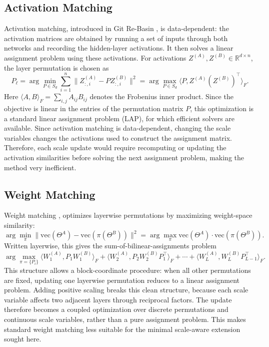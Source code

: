 \documentclass[11pt,a4paper]{report}
\begin{document}
\subsection{Activation Matching}
Activation matching, introduced in Git Re-Basin \citet{ainsworth2023git}, is data-dependent: the activation matrices are obtained by running a set of inputs through both networks and recording the hidden-layer activations. It then solves a linear assignment problem using these activations. For activations \(Z^{(A)}, Z^{(B)} \in \mathbb{R}^{d \times n}\), the layer permutation is chosen as
\[
P_\ell
=
\arg\min_{P \in S_d}
\sum_{i=1}^n \|Z^{(A)}_{:,i} - P Z^{(B)}_{:,i}\|^2
=
\arg\max_{P \in S_d}
\langle P, Z^{(A)}(Z^{(B)})^\top \rangle_F.
\]
Here \(\langle A,B\rangle_F=\sum_{i,j}A_{ij}B_{ij}\) denotes the Frobenius inner product. Since the objective is linear in the entries of the permutation matrix \(P\), this optimization is a standard linear assignment problem (LAP), for which efficient solvers are available.
Since activation matching is data-dependent, changing the scale variables changes the activations used to construct the assignment matrix. Therefore, each scale update would require recomputing or updating the activation similarities before solving the next assignment problem, making the method very inefficient.


\subsection{Weight Matching}

Weight matching \citet{ainsworth2023git}, optimizes layerwise permutations by maximizing weight-space similarity:
\[
\arg\min_{\pi} \|\mathrm{vec}(\Theta^A)-\mathrm{vec}(\pi(\Theta^B))\|^2
=
\arg\max_{\pi}\mathrm{vec}(\Theta^A)\cdot\mathrm{vec}(\pi(\Theta^B)).
\]
Written layerwise, this gives the sum-of-bilinear-assignments problem
\[
\arg\max_{\pi=\{P_i\}}
\langle W_1^{(A)},P_1W_1^{(B)}\rangle_F
+\langle W_2^{(A)},P_2W_2^{(B)}P_1^\top\rangle_F
+\cdots+
\langle W_L^{(A)},W_L^{(B)}P_{L-1}^\top\rangle_F.
\]
This structure allows a block-coordinate procedure: when all other permutations are fixed, updating one layerwise permutation reduces to a linear assignment problem. Adding positive scaling breaks this clean structure, because each scale variable affects two adjacent layers through reciprocal factors. The update therefore becomes a coupled optimization over discrete permutations and continuous scale variables, rather than a pure assignment problem. This makes standard weight matching less suitable for the minimal scale-aware extension sought here.
\end{document}
